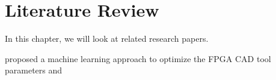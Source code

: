 \chapter{Literature Review}
In  this  chapter,  we  will  look  at   related  research  papers. 

\cite{kapre2015intime} proposed a machine learning approach to optimize the FPGA CAD tool parameters and 
